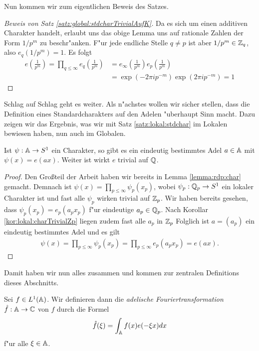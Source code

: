 	Nun kommen wir zum eigentlichen Beweis des Satzes.
	\begin{proof}[Beweis von Satz \ref{satz:global:stdcharTrivialAufK}]
		Da es sich um einen additiven Charakter handelt, erlaubt uns das obige Lemma uns auf rationale Zahlen der Form $1/p^m$ zu beschr"anken.
		F"ur jede endliche Stelle $q\not=p$ ist aber $1/p^m \in \mathbb{Z}_q$, also $e_q(1/p^m) =1$.
		Es folgt
		\begin{align*}
			e\left( \frac{1}{p^m} \right) 	= \prod_{q\leq \infty} e_q\left( \frac{1}{p^m} \right) 
											&= e_\infty \left( \frac{1}{p^m} \right) e_p\left( \frac{1}{p^m} \right)\\
											&= \exp(-2\pi i p^{-m}) \exp(2\pi i p^{-m}) = 1
		\end{align*}
	\end{proof}
	
	Schlag auf Schlag geht es weiter. 
	Als n"achstes wollen wir sicher stellen, dass die Definition eines Standardcharakters auf den Adelen "uberhaupt Sinn macht.
	Dazu zeigen wir das Ergebnis, was wir mit Satz \ref{satz:lokal:stdchar} im Lokalen bewiesen haben, nun auch im Globalen.
	\begin{satz}
		Ist $\psi: \mathbb{A} \to S^1$ ein Charakter, so gibt es ein eindeutig bestimmtes Adel $a\in\mathbb{A}$ mit $\psi(x) = e(ax)$.
		Weiter ist wirkt $e$ trivial auf $\mathbb{Q}$.
	\end{satz}
	\begin{proof}
		Den Großteil der Arbeit haben wir bereits in Lemma \ref{lemma:rdp:char} gemacht. Demnach ist $\psi(x) = \prod_{p\leq\infty} \psi_p (x_p)$, wobei $\psi_p: {\mathbb{Q}_p} \to S^1$ ein lokaler Charakter ist und fast alle $\psi_p$ wirken trivial auf ${\mathbb{Z}_p}$.
		Wir haben bereits gesehen, dass $\psi_p (x_p) = e_p(a_p x_p)$ f"ur eindeutige $a_p \in {\mathbb{Q}_p}$.
		Nach Korollar \ref{kor:lokal:charTrivialZp} liegen zudem fast alle $a_p$ in ${\mathbb{Z}_p}$
		Folglich ist $a = (a_p)$ ein eindeutig bestimmtes Adel und es gilt
		\begin{align*}
			\psi(x) = \prod_{p\leq\infty} \psi_p (x_p) = \prod_{p\leq\infty} e_p (a_px_p) = e(ax).
		\end{align*}
	\end{proof}
	
	Damit haben wir nun alles zusammen und kommen zur zentralen Definitions dieses Abschnitts.
	
	\begin{defi}
		Sei $f\in L^1(\mathbb{A})$. Wir definieren dann die \emph{adelische Fouriertransformation} $\hat{f}: \mathbb{A} \to \mathbb{C}$ von $f$ durch die Formel
	\begin{align*}
		\hat{f}(\xi) = \int_{\mathbb{A}} f(x)e(-\xi x)  d{x}
	\end{align*}
	f"ur alle $\xi \in \mathbb{A}$.
	\end{defi}
	

